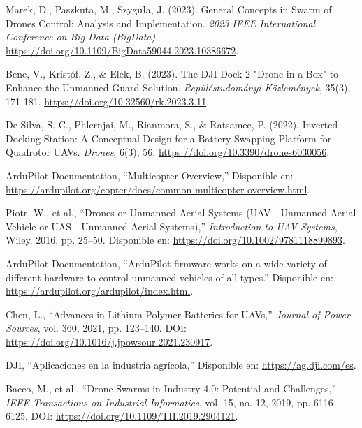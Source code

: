 
\begin{thebibliography}{30}

     Marek, D., Paszkuta, M., Szyguła, J. (2023). General Concepts in Swarm of Drones Control: Analysis and Implementation. \textit{2023 IEEE International Conference on Big Data (BigData)}. \url{https://doi.org/10.1109/BigData59044.2023.10386672}.
  
     Bene, V., Kristóf, Z., \& Elek, B. (2023). The DJI Dock 2 "Drone in a Box" to Enhance the Unmanned Guard Solution. \textit{Repüléstudományi Közlemények}, 35(3), 171-181. \url{https://doi.org/10.32560/rk.2023.3.11}.
   
     De Silva, S. C., Phlernjai, M., Rianmora, S., \& Ratsamee, P. (2022). Inverted Docking Station: A Conceptual Design for a Battery-Swapping Platform for Quadrotor UAVs. \textit{Drones}, 6(3), 56. \url{https://doi.org/10.3390/drones6030056}.

    ArduPilot Documentation, ``Multicopter Overview,'' Disponible en: \url{https://ardupilot.org/copter/docs/common-multicopter-overview.html}.


    
    Piotr, W., et al., ``Drones or Unmanned Aerial Systems (UAV - Unmanned Aerial Vehicle or UAS - Unmanned Aerial Systems),'' \textit{Introduction to UAV Systems}, Wiley, 2016, pp. 25--50. Disponible en: \url{https://doi.org/10.1002/9781118899893}.

    



     ArduPilot Documentation, ``ArduPilot firmware works on a wide variety of different hardware to control unmanned vehicles of all types.'' Disponible en: \url{https://ardupilot.org/ardupilot/index.html}.


    Chen, L., ``Advances in Lithium Polymer Batteries for UAVs,'' \textit{Journal of Power Sources}, vol. 360, 2021, pp. 123--140. DOI: \url{https://doi.org/10.1016/j.jpowsour.2021.230917}.




    DJI, ``Aplicaciones en la industria agrícola,'' Disponible en: \url{https://ag.dji.com/es}. 

    Bacco, M., et al., ``Drone Swarms in Industry 4.0: Potential and Challenges,'' \textit{IEEE Transactions on Industrial Informatics}, vol. 15, no. 12, 2019, pp. 6116--6125. DOI: \url{https://doi.org/10.1109/TII.2019.2904121}.



\end{thebibliography}
